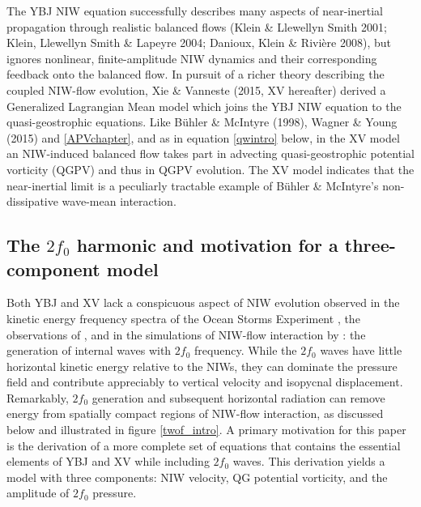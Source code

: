 \documentclass[12pt, oneside]{book}
\begin{document}
\nocite{danioux2008propagation, KLS2001,KLSL2004}

The YBJ NIW equation successfully describes many aspects of near-inertial propagation through realistic balanced  flows (Klein \& Llewellyn Smith 2001; Klein, Llewellyn Smith \& Lapeyre 2004;  Danioux, Klein \& Rivi\`ere 2008), but ignores nonlinear, finite-amplitude NIW dynamics and their corresponding feedback onto the balanced flow.  In pursuit of a richer theory describing the coupled NIW-flow evolution, \nocite{XieVanneste} Xie \& Vanneste (2015, XV hereafter) derived a Generalized Lagrangian Mean model which joins the YBJ NIW equation to the quasi-geostrophic equations.  Like B\"uhler \& McIntyre (1998), \nocite{BuhlerMcIntyre} Wagner \& Young (2015) and \ch \ref{APVchapter}, \nocite{WagnerYoung} and as in equation \eqref{qwintro} below, in the XV model an NIW-induced balanced flow takes part in advecting quasi-geostrophic potential vorticity (QGPV) and thus in QGPV evolution.  The XV model indicates that the near-inertial limit is a peculiarly tractable example of B\"uhler \& McIntyre's non-dissipative wave-mean interaction.

\subsection{The $2 f_0$ harmonic and motivation for a three-component model}

Both YBJ and XV lack a conspicuous aspect of NIW evolution observed in the kinetic energy frequency spectra of the Ocean Storms Experiment \citep{DAsaro1995}, the observations of \cite{niwa1999response}, and in the simulations of NIW-flow interaction by \cite{danioux2008propagation}: the generation of internal waves with $2f_0$ frequency.  While the $2f_0$ waves have little horizontal kinetic energy relative to the NIWs, they can dominate the pressure field and contribute appreciably to vertical velocity and isopycnal displacement.  Remarkably, $2f_0$ generation and subsequent horizontal radiation can remove energy from spatially compact regions of NIW-flow interaction, as discussed below and illustrated in figure \ref{twof_intro}.  A primary motivation for this paper is the derivation of a more complete set of equations that contains the essential elements of YBJ and XV while including $2f_0$ waves.  This derivation yields a model with three components: NIW velocity, QG potential vorticity, and the  amplitude of $2f_0$ pressure.
\end{document}
